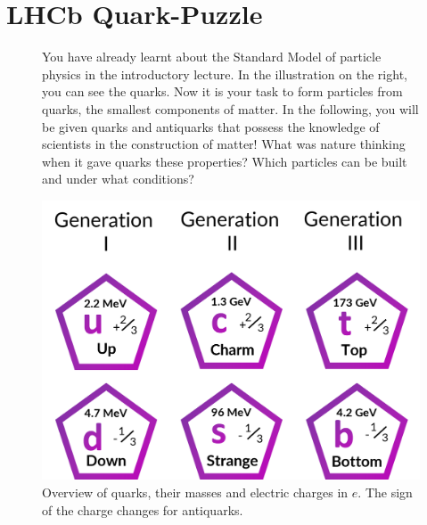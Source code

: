 \small
\section*{\huge{LHCb Quark-Puzzle}}
\begin{figure}[h]
    \begin{minipage}[t]{0.474\textwidth}
        You have already learnt about the Standard Model of particle physics in the introductory lecture. In the illustration on the right, you can see the quarks.  Now it is your task to form particles from quarks, the smallest components of matter. In the following, you will be given quarks and antiquarks that possess the knowledge of scientists in the construction of matter! What was nature thinking when it gave quarks these properties? Which particles can be built and under what conditions? 
    \end{minipage}
     \begin{minipage}[t]{0.53\textwidth}
       \vspace{-1cm}\includegraphics[width=\textwidth]{Figures Worksheets/Quarks_Quark_Puzzle_Worksheet.png}
         \caption{Overview of quarks, their masses and electric charges in $e$. The sign of the charge changes for antiquarks.}
    \end{minipage}
    \end{figure}
